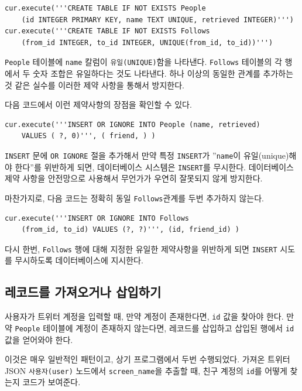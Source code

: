 \beforeverb
\begin{verbatim}
cur.execute('''CREATE TABLE IF NOT EXISTS People 
    (id INTEGER PRIMARY KEY, name TEXT UNIQUE, retrieved INTEGER)''')
cur.execute('''CREATE TABLE IF NOT EXISTS Follows 
    (from_id INTEGER, to_id INTEGER, UNIQUE(from_id, to_id))''')
\end{verbatim}
\afterverb
%

{\tt People} 테이블에 {\tt name} 칼럼이 {\tt 유일(UNIQUE)}함을 나타낸다.
{\tt Follows} 테이블의 각 행에서 두 숫자 조합은 유일하다는 것도 나타낸다.
하나 이상의 동일한 관계를 추가하는 것 같은 실수를 이러한 제약 사항을 통해서 방지한다.

다음 코드에서 이런 제약사항의 장점을 확인할 수 있다.

\beforeverb
\begin{verbatim}
cur.execute('''INSERT OR IGNORE INTO People (name, retrieved) 
    VALUES ( ?, 0)''', ( friend, ) )
\end{verbatim}
\afterverb
%

{\tt INSERT} 문에 {\tt OR IGNORE} 절을 추가해서 만약 특정 {\tt INSERT}가 
''{\tt name}이 유일(unique)해야 한다''를 위반하게 되면, 데이터베이스 시스템은 {\tt INSERT}를 무시한다.
데이터베이스 제약 사항을 안전망으로 사용해서 무언가가 우연히 잘못되지 않게 방지한다.

마찬가지로, 다음 코드는 정확히 동일 {\tt Follows}관계를 두번 추가하지 않는다.

\beforeverb
\begin{verbatim}
cur.execute('''INSERT OR IGNORE INTO Follows 
    (from_id, to_id) VALUES (?, ?)''', (id, friend_id) )
\end{verbatim}
\afterverb
%

다시 한번, {\tt Follows} 행에 대해 지정한 유일한 제약사항을 위반하게 되면 {\tt INSERT} 시도를 무시하도록 데이터베이스에 지시한다.

\subsection{레코드를 가져오거나 삽입하기}

사용자가 트위터 계정을 입력할 때, 만약 계정이 존재한다면, {\tt id} 값을 찾아야 한다.
만약 {\tt People} 테이블에 계정이 존재하지 않는다면, 레코드를 삽입하고 삽입된 행에서 {\tt id} 값을 얻어와야 한다.

이것은 매우 일반적인 패턴이고, 상기 프로그램에서 두번 수행되었다. 
가져온 트위터 JSON {\tt 사용자(user)} 노드에서 \verb"screen_name"을 추출할 때, 친구 계정의 {\tt id}를 어떻게 찾는지 코드가 보여준다.

